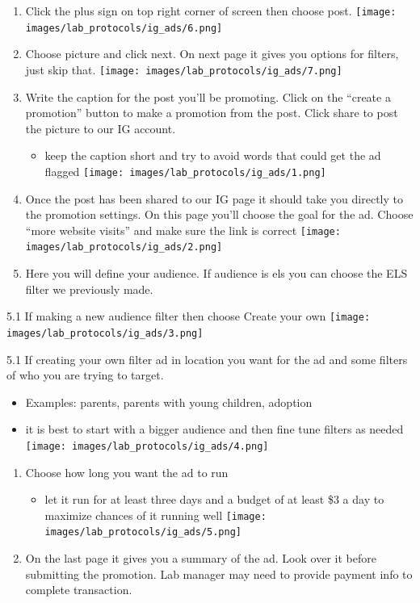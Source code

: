 \documentclass[
]{book}
\providecommand{\tightlist}{%
  \setlength{\itemsep}{0pt}\setlength{\parskip}{0pt}}
\begin{document}
\begin{enumerate}
\def\labelenumi{\arabic{enumi}.}
\item
  Click the plus sign on top right corner of screen then choose post.
  \texttt{[image: images/lab\_protocols/ig\_ads/6.png]}
\item
  Choose picture and click next. On next page it gives you options for filters, just skip that.
  \texttt{[image: images/lab\_protocols/ig\_ads/7.png]}
\item
  Write the caption for the post you'll be promoting. Click on the ``create a promotion'' button to make a promotion from the post. Click share to post the picture to our IG account.

  \begin{itemize}
  \tightlist
  \item
    keep the caption short and try to avoid words that could get the ad flagged
    \texttt{[image: images/lab\_protocols/ig\_ads/1.png]}
  \end{itemize}
\item
  Once the post has been shared to our IG page it should take you directly to the promotion settings. On this page you'll choose the goal for the ad. Choose ``more website visits'' and make sure the link is correct
  \texttt{[image: images/lab\_protocols/ig\_ads/2.png]}
\item
  Here you will define your audience. If audience is els you can choose the ELS filter we previously made.
\end{enumerate}

5.1 If making a new audience filter then choose Create your own
\texttt{[image: images/lab\_protocols/ig\_ads/3.png]}

5.1 If creating your own filter ad in location you want for the ad and some filters of who you are trying to target.

\begin{itemize}
\item
  Examples: parents, parents with young children, adoption
\item
  it is best to start with a bigger audience and then fine tune filters as needed
  \texttt{[image: images/lab\_protocols/ig\_ads/4.png]}
\end{itemize}

\begin{enumerate}
\def\labelenumi{\arabic{enumi}.}
\setcounter{enumi}{5}
\item
  Choose how long you want the ad to run

  \begin{itemize}
  \tightlist
  \item
    let it run for at least three days and a budget of at least \$3 a day to maximize chances of it running well
    \texttt{[image: images/lab\_protocols/ig\_ads/5.png]}
  \end{itemize}
\item
  On the last page it gives you a summary of the ad. Look over it before submitting the promotion. Lab manager may need to provide payment info to complete transaction.
\end{enumerate}
\end{document}
